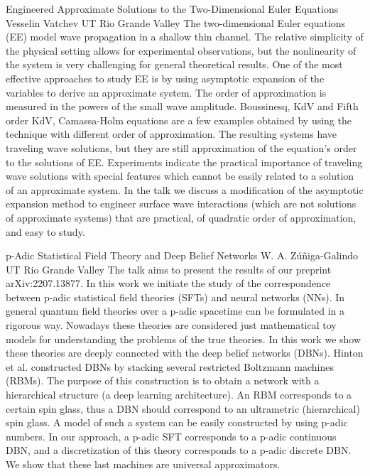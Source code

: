 \begin{addmargin}[2em]{0em}
\vspace{1.5ex}
\abs
{Engineered Approximate Solutions to the Two-Dimensional Euler Equations}
{Vesselin Vatchev}
{UT Rio Grande Valley}
{The two-dimensional Euler equations (EE) model wave propagation in a shallow thin channel. The relative simplicity of the physical setting allows for experimental observations, but the nonlinearity of the system is very challenging for general theoretical results. One of the most effective approaches to study EE is by using asymptotic expansion of the variables to derive an approximate system. The order of approximation is measured in the powers of the small wave amplitude. Boussinesq, KdV and Fifth order KdV, Camassa-Holm equations are a few examples obtained by using the technique with different order of approximation. The resulting systems have traveling wave solutions, but they are still approximation of the equation’s order to the solutions of EE. Experiments indicate the practical importance of traveling wave solutions with special features which cannot be easily related to a solution of an approximate system. In the talk we discuss a modification of the asymptotic expansion method to engineer surface wave interactions (which are not solutions of approximate systems)  that are practical, of quadratic order of approximation, and easy to study.
}



\vspace{1.5ex}
\abs
{p-Adic Statistical Field Theory and Deep Belief Networks}
{W. A. Zúñiga-Galindo }
{UT Rio Grande Valley}
{The talk aims to present the results of our preprint arXiv:2207.13877. In this work we initiate the study of the correspondence between p-adic statistical field theories (SFTs) and neural networks (NNs). In general quantum field theories over a p-adic spacetime can be formulated in a rigorous way. Nowadays these theories are considered just mathematical toy models for understanding the problems of the true theories. In this work we show these theories are deeply connected with the deep belief networks (DBNs). Hinton et al. constructed DBNs by stacking several restricted Boltzmann machines (RBMs). The purpose of this construction is to obtain a network with a hierarchical structure (a deep learning architecture). An RBM corresponds to a certain spin glass, thus a DBN should correspond to an ultrametric (hierarchical) spin glass. A model of such a system can be easily constructed by using p-adic numbers. In our approach, a p-adic SFT corresponds to a p-adic continuous DBN, and a discretization of this theory corresponds to a p-adic discrete DBN. We show that these last machines are universal approximators.  
}


\end{addmargin}
